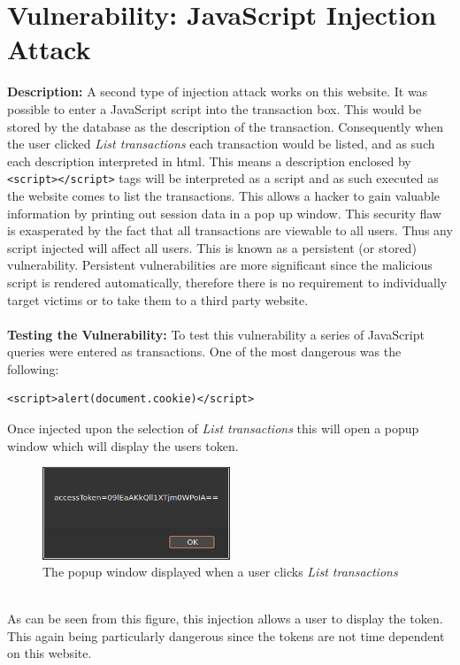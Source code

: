 \section{Vulnerability: JavaScript Injection Attack}
\label{sec:background}
\textbf{Description:} A second type of injection attack works on this website. It was possible to enter a JavaScript script into the transaction box. This would be stored by
the database as the description of the transaction. Consequently when the user clicked \textit{List transactions} each transaction would be listed, and as such each description
interpreted in html. This means a description enclosed by \verb|<script></script>| tags will be interpreted as a script and as such executed as the website comes to list the
transactions. This allows a hacker to gain valuable information by printing out session data in a pop up window. This security flaw is exasperated by the fact that all transactions
are viewable to all users. Thus any script injected will affect all users. This is known as a persistent (or stored) vulnerability. Persistent vulnerabilities are more significant
since the malicious script is rendered automatically, therefore there is no requirement to individually target victims or to take them to a third party website.\\ \\
\textbf{Testing the Vulnerability:} To test this vulnerability a series of JavaScript queries were entered as transactions. One of the most dangerous was the following:
\begin{verbatim}
<script>alert(document.cookie)</script>
\end{verbatim}
Once injected upon the selection of \textit{List transactions} this will open a popup window which will display the users token.
\begin{figure}[h]
  \centering
  \includegraphics[width=0.5\textwidth]{figs/popup.png}
  \caption{The popup window displayed when a user clicks \textit{List transactions}}
  \label{popup}
\end{figure}\\
As can be seen from this figure, this injection allows a user to display the token. This again being particularly dangerous since the tokens are not time dependent on this website.
